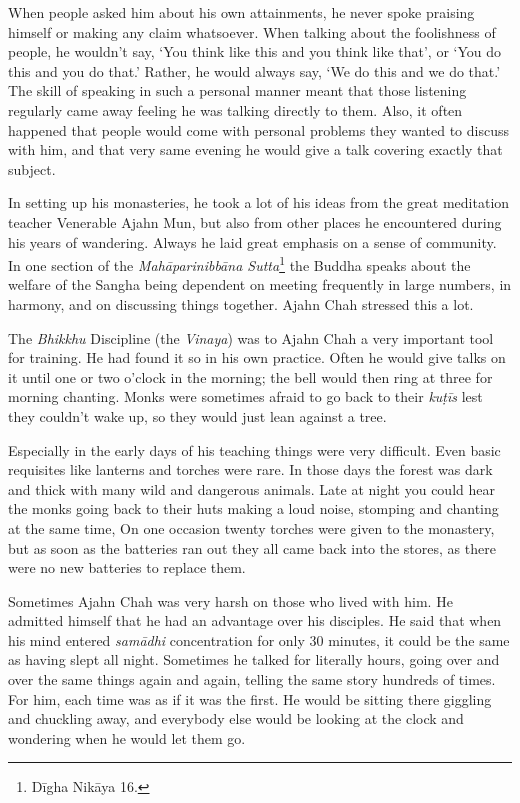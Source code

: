 When people asked him about his own attainments, he never spoke praising
himself or making any claim whatsoever. When talking about the
foolishness of people, he wouldn't say, `You think like this and you
think like that', or `You do this and you do that.' Rather, he would
always say, `We do this and we do that.' The skill of speaking in such a
personal manner meant that those listening regularly came away feeling
he was talking directly to them. Also, it often happened that people
would come with personal problems they wanted to discuss with him, and
that very same evening he would give a talk covering exactly that
subject. 

In setting up his monasteries, he took a lot of his ideas from the great
meditation teacher Venerable Ajahn Mun, but also from other places he
encountered during his years of wandering. Always he laid great emphasis
on a sense of community. In one section of the \emph{Mahāparinibbāna
Sutta}\footnote{Dīgha Nikāya 16.} the Buddha speaks
about the welfare of the Sangha being dependent on meeting frequently in
large numbers, in harmony, and on discussing things together. Ajahn Chah
stressed this a lot. 

The \emph{Bhikkhu} Discipline (the \emph{Vinaya}) was to Ajahn Chah a
very important tool for training. He had found it so in his own
practice. Often he would give talks on it until one or two o'clock in
the morning; the bell would then ring at three for morning chanting. 
Monks were sometimes afraid to go back to their \emph{kuṭīs} lest they
couldn't wake up, so they would just lean against a tree. 

Especially in the early days of his teaching things were very difficult. 
Even basic requisites like lanterns and torches were rare. In those days
the forest was dark and thick with many wild and dangerous animals. Late
at night you could hear the monks going back to their huts making a loud
noise, stomping and chanting at the same time, On one occasion twenty
torches were given to the monastery, but as soon as the batteries ran
out they all came back into the stores, as there were no new batteries
to replace them. 

Sometimes Ajahn Chah was very harsh on those who lived with him. He
admitted himself that he had an advantage over his disciples. He said
that when his mind entered \emph{samādhi} concentration for only 30
minutes, it could be the same as having slept all night. Sometimes he
talked for literally hours, going over and over the same things again
and again, telling the same story hundreds of times. For him, each time
was as if it was the first. He would be sitting there giggling and
chuckling away, and everybody else would be looking at the clock and
wondering when he would let them go. 

